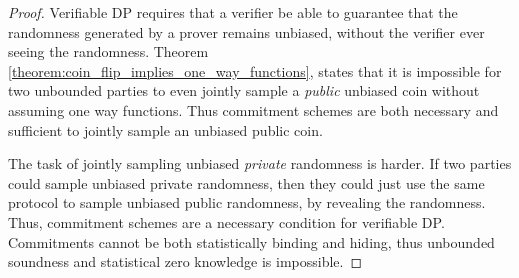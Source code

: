 \begin{proof}
%

Verifiable DP requires that a verifier be able to guarantee that the randomness generated by a prover remains unbiased, without the verifier ever seeing the randomness. Theorem \ref{theorem:coin_flip_implies_one_way_functions}, states that it is impossible for two unbounded parties to even jointly sample a \textit{public} unbiased coin without assuming one way functions. 
Thus commitment schemes are both necessary and sufficient to jointly sample an unbiased public coin. \par
The task of jointly sampling unbiased \textit{private} randomness is harder. If two parties could sample unbiased private randomness, then they could just use the same protocol to sample unbiased public randomness, by revealing the randomness.
Thus, commitment schemes are a necessary condition for verifiable DP.
Commitments cannot be both statistically binding and hiding, thus unbounded soundness and statistical zero knowledge is impossible.
\end{proof}



